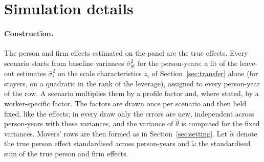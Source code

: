 \section{Simulation details}\label{app:sim}

\paragraph{Construction.} The person and firm effects estimated on the panel are the true effects. Every
scenario starts from baseline variances $\bar\sigma^2_{gt}$ for the person-years: a fit of the leave-out
estimates $\hat\sigma_i^2$ on the scale characteristics $z_i$ of Section~\ref{sec:transfer} alone (for stayers, on a
quadratic in the rank of the leverage), assigned to every person-year of the row. A scenario multiplies them
by a profile factor and, where stated, by a worker-specific factor. The factors are drawn once per scenario
and then held fixed, like the effects; in every draw only the errors are new, independent across person-years
with these variances, and the variance of $\hat\theta$ is computed for the fixed variances. Movers' rows are then formed as in Section~\ref{sec:setting}. Let $\tilde\alpha$
denote the true person effect standardised across person-years and $\tilde\omega$ the standardised sum of the
true person and firm effects.

